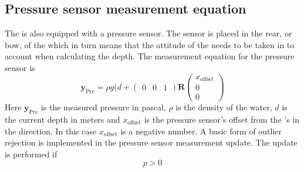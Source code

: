 \subsection{Pressure sensor measurement equation}
The \abbrROV is also equipped with a pressure sensor. The sensor is placed in the rear, or bow, of the \abbrROV which in turn means that the attitude of the \abbrROV needs to be taken in to account when calculating the depth.
The measurement equation for the pressure sensor is
\begin{equation}
 \boldsymbol{y}_{\text{Pre}}=  \rho g (d + \begin{pmatrix}
    0 & 0 & 1
\end{pmatrix} \boldsymbol{R} 
\begin{pmatrix}
x_{\text{offset}}\\
0\\
0
\end{pmatrix}
\end{equation}
Here $\boldsymbol{y}_{\text{Pre}}$ is the measured pressure in pascal, $\rho$ is the density of the water, $d$ is the current depth in meters and $x_{\text{offset}}$ is the pressure sensor's offset from the \abbrROV's \abbrCO in the \xPosition direction. In this case $x_{\textrm{offset}}$ is a negative number. A basic form of outlier rejection is implemented in the pressure sensor measurement update. The update is performed if
\begin{equation}
    p > 0
\end{equation}
